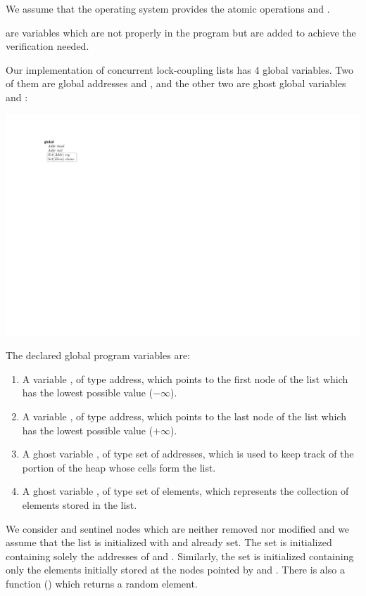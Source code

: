 We assume that the operating system provides the atomic operations \fLock 
and \fUnlock. 

 are variables which are not properly in the program but are added to 
achieve the verification needed.

Our implementation of concurrent lock-coupling lists has 4 global variables.
%
Two of them are
global addresses \head and \tail, and the other two are ghost global variables \region 
and \elements:
%
\begin{center}
	\includegraphics[scale=\figscale]{graphics/_lists_classes}
\end{center}
%
The declared global program variables are:
%
\begin{enumerate}
		\item A variable \head, of type address, which points to the 
			first node of the list which has the lowest possible value ($-\infty$).
		\item A variable \tail, of type address, which points to the 
			last node of the list  which has the lowest possible value ($+\infty$).
		\item A ghost variable \region, of type set of addresses, which is 
			used to keep track of the portion of the heap whose cells form the 
			list.
		\item A ghost variable \elements, of type set of elements, which 
			represents the collection of elements stored in the list.
\end{enumerate}


We consider \head and \tail sentinel nodes which are neither removed nor 
modified and we assume that the list is initialized with \head and \tail 
already set.
%
The set \region is initialized containing solely the addresses of \head 
and \tail.
%
Similarly, the set \elements is initialized containing only the elements 
initially stored at the nodes pointed by \head and \tail.
%
There is also a function () which returns a random element. 

